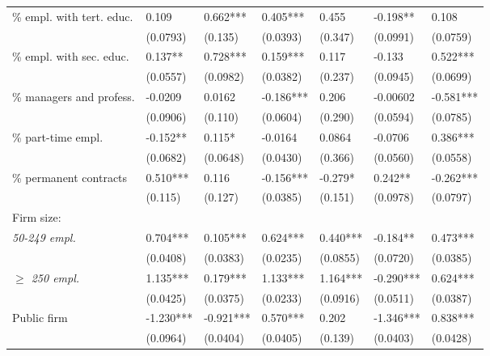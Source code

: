 \documentclass[12pt]{article}
\begin{document}
\begin{table}[thb]
{\begin{threeparttable}
\begin{tabular}{l*{6}{l}}
\% empl. with tert. educ. &  0.109     & 0.662***  & 0.405***   & 0.455     & -0.198**   & 0.108      \\
                          &  (0.0793)  & (0.135)   & (0.0393)   & (0.347)   & (0.0991)   & (0.0759)   \\[0.5ex]

\% empl. with sec. educ.  &  0.137**   & 0.728***  & 0.159***   & 0.117     & -0.133     & 0.522***   \\
                          &  (0.0557)  & (0.0982)  & (0.0382)   & (0.237)   & (0.0945)   & (0.0699)   \\[0.5ex]

\% managers and profess.  &  -0.0209   & 0.0162    & -0.186***  & 0.206     & -0.00602   & -0.581***  \\
                          &  (0.0906)  & (0.110)   & (0.0604)   & (0.290)   & (0.0594)   & (0.0785)   \\[0.5ex]

\% part-time empl.        &  -0.152**  & 0.115*    & -0.0164    & 0.0864    & -0.0706    & 0.386***   \\
                          &  (0.0682)  & (0.0648)  & (0.0430)   & (0.366)   & (0.0560)   & (0.0558)   \\[0.5ex]

\% permanent contracts    &  0.510***  & 0.116     & -0.156***  & -0.279*   & 0.242**    & -0.262***  \\
                          &  (0.115)   & (0.127)   & (0.0385)   & (0.151)   & (0.0978)   & (0.0797)   \\[0.5ex]

Firm size:                \\[1ex]
\quad \textit{50-249 empl.}              &  0.704***  & 0.105***  & 0.624***   & 0.440***  & -0.184**   & 0.473***   \\
                          &  (0.0408)  & (0.0383)  & (0.0235)   & (0.0855)  & (0.0720)   & (0.0385)   \\[0.5ex]

\quad \textit{$\geq$ 250 empl.}         &  1.135***  & 0.179***  & 1.133***   & 1.164***  & -0.290***  & 0.624***   \\
                          &  (0.0425)  & (0.0375)  & (0.0233)   & (0.0916)  & (0.0511)   & (0.0387)   \\[0.5ex]

Public firm               &  -1.230*** & -0.921*** & 0.570***   & 0.202     & -1.346***  & 0.838***   \\
                          &  (0.0964)  & (0.0404)  & (0.0405)   & (0.139)   & (0.0403)   & (0.0428)   \\[0.5ex]


\end{tabular}
\end{threeparttable}}
\end{table}
\end{document}
